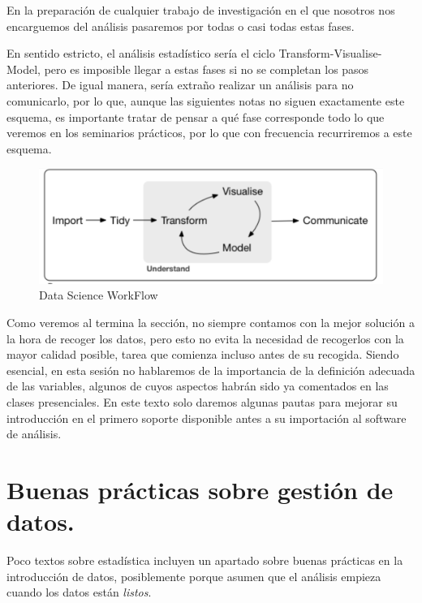 \documentclass[
  letterpaper,
  DIV=11,
  numbers=noendperiod]{scrreprt}
\begin{document}
En la preparación de cualquier trabajo de investigación en el que
nosotros nos encarguemos del análisis pasaremos por todas o casi todas
estas fases.

En sentido estricto, el análisis estadístico sería el ciclo
Transform-Visualise-Model, pero es imposible llegar a estas fases si no
se completan los pasos anteriores. De igual manera, sería extraño
realizar un análisis para no comunicarlo, por lo que, aunque las
siguientes notas no siguen exactamente este esquema, es importante
tratar de pensar a qué fase corresponde todo lo que veremos en los
seminarios prácticos, por lo que con frecuencia recurriremos a este
esquema.

\begin{figure}

{\centering \includegraphics{./pics/datascience_proj.png}

}

\caption{Data Science WorkFlow}

\end{figure}

Como veremos al termina la sección, no siempre contamos con la mejor
solución a la hora de recoger los datos, pero esto no evita la necesidad
de recogerlos con la mayor calidad posible, tarea que comienza incluso
antes de su recogida. Siendo esencial, en esta sesión no hablaremos de
la importancia de la definición adecuada de las variables, algunos de
cuyos aspectos habrán sido ya comentados en las clases presenciales. En
este texto solo daremos algunas pautas para mejorar su introducción en
el primero soporte disponible antes a su importación al software de
análisis.

\hypertarget{buenas-pruxe1cticas-sobre-gestiuxf3n-de-datos.}{%
\section{Buenas prácticas sobre gestión de
datos.}\label{buenas-pruxe1cticas-sobre-gestiuxf3n-de-datos.}}

Poco textos sobre estadística incluyen un apartado sobre buenas
prácticas en la introducción de datos, posiblemente porque asumen que el
análisis empieza cuando los datos están \emph{listos}.
\end{document}
